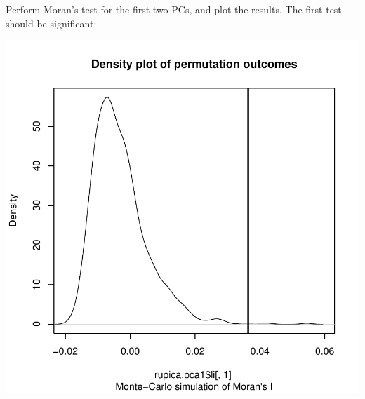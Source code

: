 \documentclass{article}
\begin{document}
Perform Moran's test for the first two PCs, and plot the results.
The first test should be significant:
\begin{Schunk}
\end{Schunk}
\includegraphics{figs/spca-043}
\end{document}
